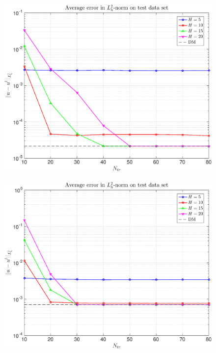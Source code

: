 \documentclass[11pt,a4paper]{article}
\theoremstyle{definition}
\theoremstyle{theorem}
\numberwithin{equation}{section}
\begin{document}
	\begin{figure}[H]
		\center
		\includegraphics[scale = 0.5]{fig1}
		\caption{}
	\end{figure}
	
	\begin{figure}[H]
		\center
		\includegraphics[scale = 0.5]{fig2}
		\caption{}
	\end{figure}
	
\end{document}
